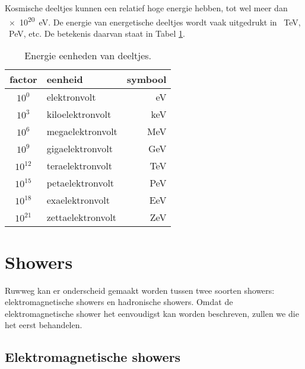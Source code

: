 Kosmische deeltjes kunnen een relatief hoge energie hebben, tot wel meer
dan \SI{e20}{\electronvolt}. De energie van energetische deeltjes wordt
vaak uitgedrukt in \SI{}{\tera\electronvolt}, \SI{}{\peta\electronvolt},
etc. De betekenis daarvan staat in Tabel \ref{eenheden}.

\begin{table}[h]
    \centering
    \begin{tabular}{|c|l|r|} \hline
        factor & eenheid & symbool \\ \hline
        $10^0$ & elektronvolt & eV \\
        $10^3$ & kiloelektronvolt & keV \\
        $10^6$ & megaelektronvolt & MeV \\
        $10^9$ & gigaelektronvolt & GeV \\
        $10^{12}$ & teraelektronvolt & TeV \\
        $10^{15}$ & petaelektronvolt & PeV \\
        $10^{18}$ & exaelektronvolt & EeV \\
        $10^{21}$ & zettaelektronvolt & ZeV \\ \hline
    \end{tabular}
    \caption{Energie eenheden van deeltjes.}
    \label{eenheden}
\end{table}


\section{Showers}

Ruwweg kan er onderscheid gemaakt worden tussen twee soorten showers:
elektromagnetische showers en hadronische showers. Omdat de
elektromagnetische shower het eenvoudigst kan worden beschreven, zullen
we die het eerst behandelen. 


\subsection{Elektromagnetische showers}

